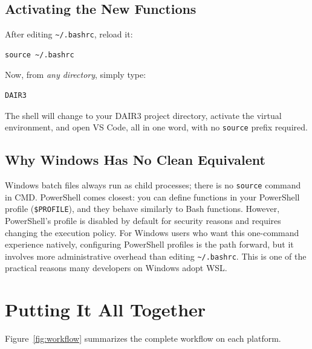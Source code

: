 \subsection{Activating the New Functions}

After editing \texttt{\textasciitilde/.bashrc}, reload it:

\begin{lstlisting}[style=linuxStyle]
source ~/.bashrc
\end{lstlisting}

Now, from \emph{any directory}, simply type:

\begin{lstlisting}[style=linuxStyle]
DAIR3
\end{lstlisting}

The shell will change to your DAIR3 project directory, activate the
virtual environment, and open VS Code, all in one word, with no
\texttt{source} prefix required.

\subsection{Why Windows Has No Clean Equivalent}

Windows batch files always run as child processes; there is no
\texttt{source} command in CMD. PowerShell comes closest: you can define
functions in your PowerShell profile (\texttt{\$PROFILE}), and they
behave similarly to Bash functions. However, PowerShell's profile is
disabled by default for security reasons and requires changing the
execution policy. For Windows users who want this one-command experience
natively, configuring PowerShell profiles is the path forward, but it
involves more administrative overhead than editing
\texttt{\textasciitilde/.bashrc}. This is one of the practical reasons
many developers on Windows adopt WSL.

\section{Putting It All Together}
\label{sec:together}

Figure~\ref{fig:workflow} summarizes the complete workflow on each platform.

